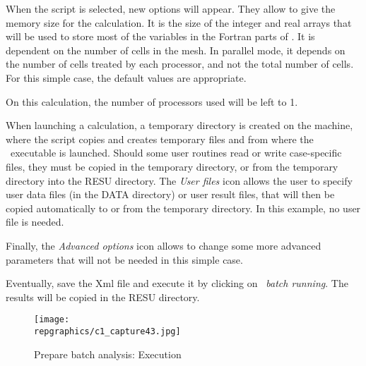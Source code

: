 \clearpage
When the script is selected, new options will appear. They allow to give the
memory size for the calculation. It is the size of the integer and real arrays
that will be used to store most of the variables in the Fortran parts of \CS.
It is dependent on the number of cells in the mesh. In parallel mode, it depends
on the number of cells treated by each processor, and not the total number of
cells. For this simple case, the default values are appropriate.

On this calculation, the number of processors used will be left to 1.

When launching a calculation, a temporary directory is created on the machine,
where the script copies and creates temporary files and from where the \CS\
executable is launched. Should some user routines read or write case-specific
files, they must be copied in the temporary directory, or from the temporary
directory into the RESU directory. The {\itshape User files} icon allows the
user to specify user data files (in the DATA directory) or user result files,
that will then be copied automatically to or from the temporary directory.
In this example, no user file is needed.

Finally, the {\itshape Advanced options} icon allows to change some more
advanced parameters that will not be needed in this simple case.

Eventually, save the Xml file and execute it by clicking on
{\itshape \CS\ batch running}. The results will be copied in the RESU
directory.

\begin{figure}[ht]
\begin{center}
\texttt{[image: \\repgraphics/c1\_capture43.jpg]}
\caption{Prepare batch analysis: Execution}
\label{fig43_e1}
\end{center}
\end{figure}


